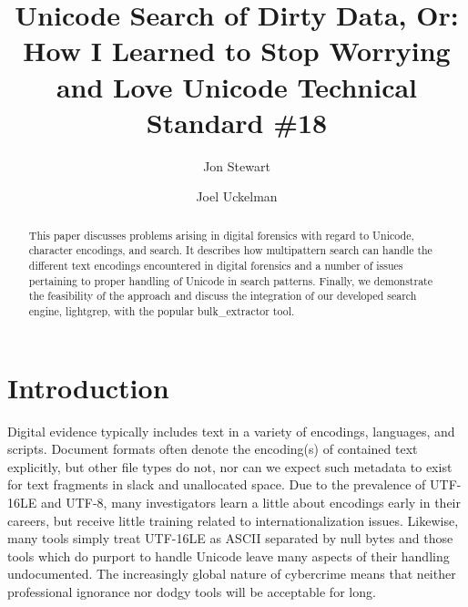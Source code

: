 \documentclass[5p,final,number,sort&compress]{elsarticle}
\begin{document}
\begin{frontmatter}

\title{Unicode Search of Dirty Data, Or:\\ How I Learned to Stop Worrying and Love Unicode Technical Standard \#18}

\author{Jon Stewart}

\author{Joel Uckelman}

\address{Lightbox Technologies, Inc. \\ Arlington, VA}

\begin{abstract}
This paper discusses problems arising in digital forensics with regard to Unicode, character encodings, and search. It describes how multipattern search can handle the different text encodings encountered in digital forensics and a number of issues pertaining to proper handling of Unicode in search patterns. Finally, we demonstrate the feasibility of the approach and discuss the integration of our developed search engine, lightgrep, with the popular bulk\_extractor tool.
\end{abstract}

\end{frontmatter}

\section{Introduction}

Digital evidence typically includes text in a variety of encodings, languages, and scripts. Document formats often denote the encoding(s) of contained text explicitly, but other file types do not, nor can we expect such metadata to exist for text fragments in slack and unallocated space. Due to the prevalence of UTF-16LE and UTF-8, many investigators learn a little about encodings early in their careers, but receive little training related to internationalization issues. Likewise, many tools simply treat UTF-16LE as ASCII separated by null bytes and those tools which do purport to handle Unicode leave many aspects of their handling undocumented. The increasingly global nature of cybercrime means that neither professional ignorance nor dodgy tools will be acceptable for long.
\end{document}
